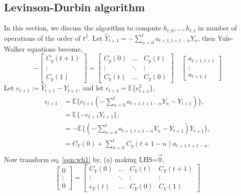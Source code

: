 \documentclass[11pt,english]{article}
\begin{document}
{\subsection{Levinson-Durbin algorithm}
In this section, we discuss the algorithm to compute $h_{t,0},\ldots,h_{t,t}$ in number of operations of the order of $t^2$. Let  $\hat{Y}_{t+1}=-\sum_{n=0}^t a_{{t+1},{t+1-n}}Y_n$, then Yule-Walker equations become,
\begin{equation}
-\begin{bmatrix}
C_y(t+1)\\
\vdots\\
C_y(1)
\end{bmatrix}
= \begin{bmatrix}
C_y(0) & \ldots & C_y(t)\\
\vdots & \ddots & \vdots\\
C_y(t) & \ldots & C_y(0)
\end{bmatrix}\quad 
\begin{bmatrix}
a_{t+1,t+1}\\
\vdots\\
a_{t+1,1}
\end{bmatrix}
\end{equation}
Let $e_{t+1} := \hat{Y}_{t+1}-Y_{t+1}$, and let $\epsilon_{t+1}= \mathbb{E}\{e_{t+1}^2\}$,
\begin{align*} 
\epsilon_{t+1} &= \mathbb{E}\{e_{t+1}(-\sum_{n=0}^t a_{t+1,t+1-n}Y_n-Y_{t+1})\},\\
&= \mathbb{E}\{-e_{t+1}Y_{t+1}\},\\
&= -\mathbb{E}\{(-\sum_{n=0}^t a_{t+1,t+1-n}Y_n-Y_{t+1})Y_{t+1}\},\\
&= C_Y(0)+\sum_{n=0}^t C_y(t+1-n)a_{t+1,t+1-n}.\\
\end{align*}
Now transform eq. \eqref{eqn:wh1} by, (a) making LHS=$\vec{0}$,
\begin{equation}
\begin{bmatrix}
0\\
\vdots\\
0 
\end{bmatrix} = 
\begin{bmatrix}
C_Y(0) &\ldots &C_Y(t) &C_Y(t+1)\\
\vdots &\ddots &\vdots &\vdots\\
c_Y(t) &\ldots &C_Y(0) &C_Y(1)


\end{bmatrix}
\end{equation}}
\end{document}
